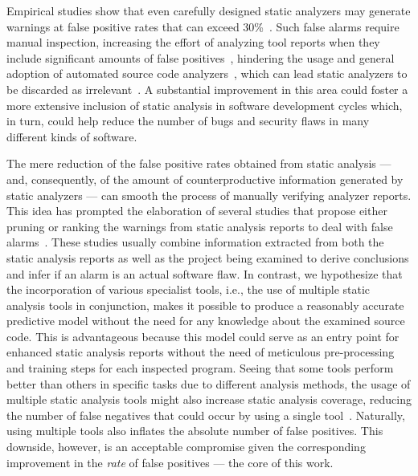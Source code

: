 Empirical studies show that even carefully designed static analyzers may
generate warnings at false positive rates that can exceed
30\%~\citep{kremenek2004correlation}. Such false alarms require manual
inspection, increasing the effort of analyzing tool reports when they include
significant amounts of false
positives~\citep{muske2013review,heckman2007adaptively}, hindering the usage and
general adoption of automated source code analyzers~\citep{johnson_why_2013},
which can lead static analyzers to be discarded as
irrelevant~\citep{kremenek2003z}.
A substantial improvement in this area could foster
a more extensive inclusion of static analysis in software development cycles which,
in turn, could help reduce the number of bugs and security flaws in many different
kinds of software.

The mere reduction of the false positive rates obtained from static analysis
--- and, consequently, of the amount of counterproductive information generated
by static analyzers --- can smooth the process of manually verifying analyzer
reports. This idea has prompted the elaboration of several studies that propose
either pruning or ranking the warnings from static analysis reports to deal
with false
alarms~\citep{ruthruff_predicting_2008,kremenek2004correlation,heckman2009model,jung2005taming}.
These studies usually combine information extracted from both the static
analysis reports as well as the project being examined to derive conclusions
and infer if an alarm is an actual software flaw. In contrast, we hypothesize
that the incorporation of various specialist tools, i.e., the use of multiple
static analysis tools in conjunction, makes it possible to produce a reasonably
accurate predictive model without the need for any knowledge about the examined
source code.  This is advantageous because this model could serve as an entry
point for enhanced static analysis reports without the need of meticulous
pre-processing and training steps for each inspected program. Seeing that some
tools perform better than others in specific tasks due to different analysis
methods, the usage of multiple static analysis tools might also increase static
analysis coverage, reducing the number of false negatives that could occur by
using a single tool~\citep{black2009static}. Naturally, using multiple tools
also inflates the absolute number of false positives. This downside, however,
is an acceptable compromise given the corresponding improvement in the
\emph{rate} of false positives --- the core of this work.

